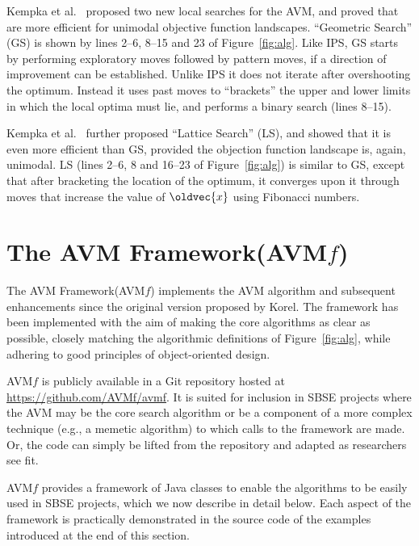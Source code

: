 \documentclass{llncs}
\let\vec\oldvec %
\newcommand{\longname}{AVM Framework\xspace}
\newcommand{\name}{AVM\hspace{-1pt}$f$\xspace}
\newcommand{\repourl}{\url{https://github.com/AVMf/avmf}\xspace}
\newcommand{\inlineheading}[1]{\vspace{1mm} \noindent {\bf #1.}}
\begin{document}
\inlineheading{New Variable Search Algorithms}
Kempka et al.~\cite{Kempka2015} proposed two new local searches for the AVM, and proved that are more efficient for unimodal objective function landscapes. ``Geometric Search'' (GS) is shown by lines 2--6, 8--15 and 23 of Figure~\ref{fig:alg}. Like IPS, GS starts by performing exploratory moves followed by pattern moves, if a direction of improvement can be established. Unlike IPS it does not iterate after overshooting the optimum. Instead it uses past moves to  ``brackets'' the upper and lower limits in which the local optima must lie, and performs a binary search (lines 8--15).

Kempka et al.~\cite{Kempka2015} further proposed ``Lattice Search'' (LS), and showed that it is even more efficient than GS, provided the objection function landscape is, again, unimodal. LS (lines 2--6, 8 and 16--23 of Figure~\ref{fig:alg}) is similar to GS, except that after bracketing the location of the optimum, it converges upon it through moves that increase the value of $\vec{x}$ using Fibonacci numbers.


\section{The \longname (\name)}
\label{sec:avmf}
The \longname (\name) implements the AVM algorithm and subsequent enhancements since the original version proposed by Korel. The framework has been implemented with the aim of making the core algorithms as clear as possible, closely matching the algorithmic definitions of Figure~\ref{fig:alg}, while adhering to good principles of object-oriented design.

\name is publicly available in a Git repository hosted at \repourl. It is suited for inclusion in SBSE projects where the AVM may be the core search algorithm or be a component of a more complex technique (e.g., a memetic algorithm) to which calls to the framework are made. Or, the code can simply be lifted from the repository and adapted as researchers see fit.

\name provides a framework of Java classes to enable the algorithms to be easily used in SBSE projects, which we now describe in detail below. Each aspect of the framework is practically demonstrated in the source code of the examples introduced at the end of this section.
\end{document}
